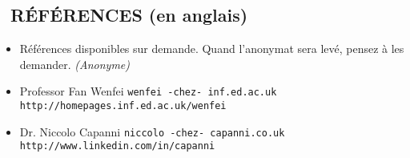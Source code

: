 \documentclass{res}
\begin{document}
\begin{resume}
\section{\faUserCheck~R\'EF\'ERENCES (en anglais)}
    \ifisanon
        \begin{itemize}
            \item[] R\'ef\'erences disponibles sur demande. Quand l'anonymat sera lev\'e, pensez \`a les demander. \textit{(Anonyme)}
        \end{itemize}
    \else
        \begin{itemize}
            \item[] Professor Fan Wenfei \tabto{4cm} \texttt{wenfei -chez- inf.ed.ac.uk} \hfill \texttt{http://homepages.inf.ed.ac.uk/wenfei}
            \item[] Dr. Niccolo Capanni \tabto{4cm} \texttt{niccolo -chez- capanni.co.uk} \hfill \texttt{http://www.linkedin.com/in/capanni}
        \end{itemize}
    \fi

\end{resume}
\end{document}
